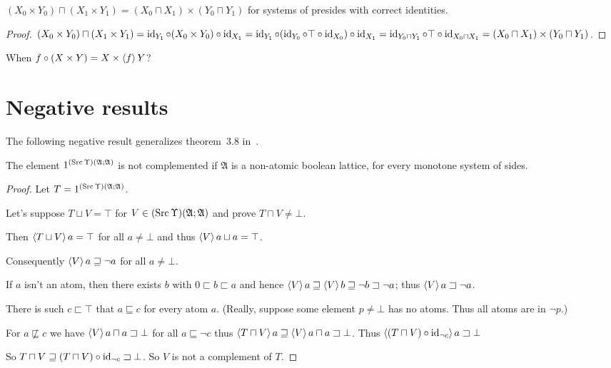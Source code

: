 \begin{prop}
$(X_0\times Y_0)\sqcap(X_1\times Y_1) = (X_0\sqcap X_1)\times(Y_0\sqcap Y_1)$ for systems of presides with correct identities.
\end{prop}

\begin{proof}
$(X_0 \times Y_0) \sqcap (X_1 \times Y_1) = \operatorname{id}_{Y_1} \circ (X_0 \times
Y_0) \circ \operatorname{id}_{X_1} = \operatorname{id}_{Y_1} \circ (\operatorname{id}_{Y_0} \circ \top
\circ \operatorname{id}_{X_0}) \circ \operatorname{id}_{X_1} = \operatorname{id}_{Y_0 \sqcap Y_1}
\circ \top \circ \operatorname{id}_{X_0 \sqcap X_1} = (X_0 \sqcap X_1) \times (Y_0
\sqcap Y_1)$.
\end{proof}


When $f\circ(X\times Y) = X\times\left\langle f\right\rangle Y$?


\section{Negative results}

The following negative result generalizes theorem~3.8 in~\cite{tprod-dist-lat}.

\begin{thm}\label{neg-prod}
  The element $1^{(\operatorname{Src}\Upsilon)(\mathfrak{A}; \mathfrak{A})}$ is not
  complemented if $\mathfrak{A}$ is a non-atomic boolean lattice,
  for every monotone system of sides.
\end{thm}

\begin{proof}
  Let $T = 1^{(\operatorname{Src}\Upsilon)(\mathfrak{A}; \mathfrak{A})}$.
  
  Let's suppose $T \sqcup V = \top$ for $V \in (\operatorname{Src}\Upsilon) (\mathfrak{A};
  \mathfrak{A})$ and prove $T \sqcap V \neq \bot$.
  
  Then $\left\langle T \sqcup V\right\rangle a = \top$ for all $a \neq \bot$ and thus $\left\langle V\right\rangle
  a \sqcup a = \top$.
  
  Consequently $\left\langle V\right\rangle a \sqsupseteq \neg a$ for all $a \neq \bot$.
  
  If $a$ isn't an atom, then there exists $b$ with $0 \sqsubset b \sqsubset a$
  and hence $\left\langle V\right\rangle a \sqsupseteq \left\langle V\right\rangle b \sqsupseteq \neg b \sqsupset \neg a$;
  thus $\left\langle V\right\rangle a \sqsupset \neg a$.
  
  There is such $c\sqsubset\top$ that $a \sqsubseteq c$ for every atom $a$. (Really,
  suppose some element $p \neq \bot$ has no atoms. Thus all atoms are in $\neg
  p$.)
  
  For $a \nsqsubseteq c$ we have $\left\langle V\right\rangle a \sqcap a \sqsupset \bot$
  for all $a \sqsubseteq \neg c$ thus $\left\langle T \sqcap V\right\rangle a \sqsupseteq
  \left\langle V\right\rangle a \sqcap a \sqsupset \bot$. Thus $\left\langle (T \sqcap V) \circ
  \operatorname{id}_{\neg c}\right\rangle a \sqsupset \bot$
  
  So $T \sqcap V \sqsupseteq (T \sqcap V) \circ \operatorname{id}_{\neg c} \sqsupset
  \bot$. So $V$ is not a complement of $T$.
\end{proof}

